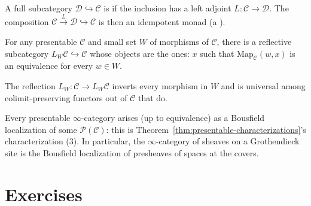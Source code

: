 \begin{definition}
\label{def:reflective}
A full subcategory $\mathcal{D} \hookrightarrow \mathcal{C}$ is
 if the inclusion has a left adjoint $L : \mathcal{C}
\to \mathcal{D}$. The composition $\mathcal{C} \xrightarrow{L} \mathcal{D}
\hookrightarrow \mathcal{C}$ is then an idempotent monad (a ).
\end{definition}

\begin{theorem}
\label{thm:bousfield}
For any presentable $\mathcal{C}$ and small set $W$ of morphisms of
$\mathcal{C}$, there is a reflective subcategory $L_W \mathcal{C}
\hookrightarrow \mathcal{C}$ whose objects are the  ones:
$x$ such that $\mathrm{Map}_\mathcal{C}(w, x)$ is an equivalence for
every $w \in W$.

The reflection $L_W : \mathcal{C} \to L_W \mathcal{C}$ inverts every
morphism in $W$ and is universal among colimit-preserving functors out
of $\mathcal{C}$ that do.
\end{theorem}

\begin{remark}
Every presentable $\infty$-category arises (up to equivalence) as a
Bousfield localization of some $\mathcal{P}(\mathcal{C})$: this is
Theorem~\ref{thm:presentable-characterizations}'s characterization (3).
In particular, the $\infty$-category of sheaves on a Grothendieck site is
the Bousfield localization of presheaves of spaces at the covers.
\end{remark}


\section{Exercises}
\label{sec:presentable-exercises}

